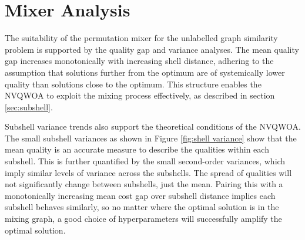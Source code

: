 \section{Mixer Analysis}
The suitability of the permutation mixer for the unlabelled graph similarity problem is supported by the quality gap and variance analyses. The mean quality gap increases monotonically with increasing shell distance, adhering to the assumption that solutions further from the optimum are of systemically lower quality than solutions close to the optimum. This structure enables the NVQWOA to exploit the mixing process effectively, as described in section \ref{sec:subshell}.

Subshell variance trends also support the theoretical conditions of the NVQWOA. The small subshell variances as shown in Figure \ref{fig:shell variance} show that the mean quality is an accurate measure to describe the qualities within each subshell. This is further quantified by the small second-order variances, which imply similar levels of variance across the subshells. The spread of qualities will not significantly change between subshells, just the mean. Pairing this with a monotonically increasing mean cost gap over subshell distance implies each subshell behaves similarly, so no matter where the optimal solution is in the mixing graph, a good choice of hyperparameters will successfully amplify the optimal solution.